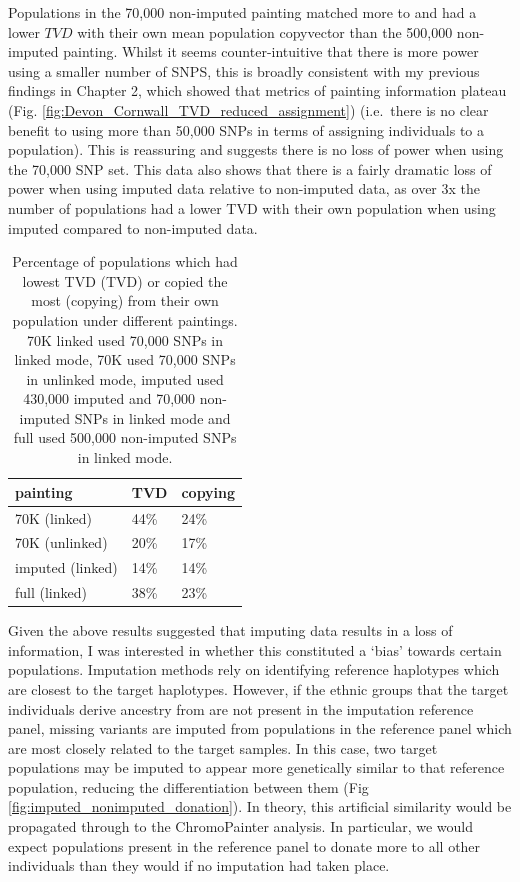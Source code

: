 Populations in the 70,000 non-imputed painting matched more to and had a lower $TVD$ with their own mean population copyvector than the 500,000 non-imputed painting. Whilst it seems counter-intuitive that there is more power using a smaller number of SNPS, this is broadly consistent with my previous findings in Chapter 2, which showed that metrics of painting information plateau (Fig. \ref{fig:Devon_Cornwall_TVD_reduced_assignment}) (i.e.\ there is no clear benefit to using more than 50,000 SNPs in terms of assigning individuals to a population). This is reassuring and suggests there is no loss of power when using the 70,000 SNP set. This data also shows that there is a fairly dramatic loss of power when using imputed data relative to non-imputed data, as over 3x the number of populations had a lower TVD with their own population when using imputed compared to non-imputed data.

\begin{table}
\centering
\small
\begin{tabular}{l|l|l}
\toprule
painting & TVD & copying\\
\midrule
70K (linked) & 44\% & 24\%\\
70K (unlinked) & 20\% & 17\%\\
imputed (linked) & 14\% & 14\%\\
full (linked) & 38\% & 23\%\\
\bottomrule
\end{tabular}
\caption{Percentage of populations which had lowest TVD (TVD) or copied the most (copying) from their own population under different paintings. 70K linked used 70,000 SNPs in linked mode, 70K used 70,000 SNPs in unlinked mode, imputed used 430,000 imputed and 70,000 non-imputed SNPs in linked mode and full used 500,000 non-imputed SNPs in linked mode.}
\label{table:TVD_copying}
\end{table}

Given the above results suggested that imputing data results in a loss of information, I was interested in whether this constituted a `bias' towards certain populations. Imputation methods rely on identifying reference haplotypes which are closest to the target haplotypes. However, if the ethnic groups that the target individuals derive ancestry from are not present in the imputation reference panel, missing variants are imputed from populations in the reference panel which are most closely related to the target samples. In this case, two target populations may be imputed to appear more genetically similar to that reference population, reducing the differentiation between them (Fig \ref{fig:imputed_nonimputed_donation}). In theory, this artificial similarity would be propagated through to the ChromoPainter analysis. In particular, we would expect populations present in the reference panel to donate more to all other individuals than they would if no imputation had taken place.  

